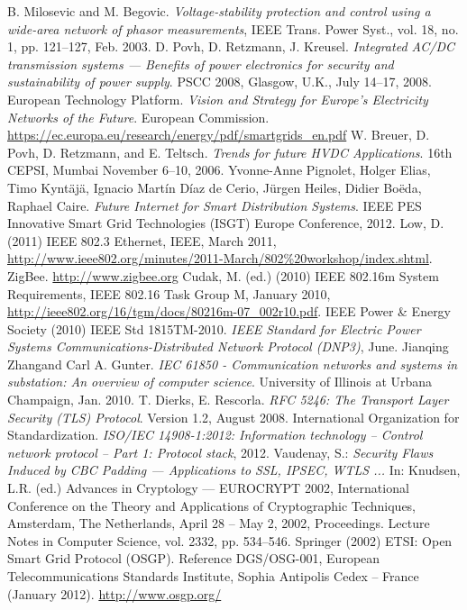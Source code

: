 \documentclass[11pt,oneside]{book}
\begin{document}
\begin{thebibliography}{99}
 B. Milosevic and M. Begovic. \emph{Voltage-stability protection and control using a wide-area network of phasor measurements}, IEEE Trans. Power Syst., vol. 18, no. 1, pp. 121–127, Feb. 2003. 
 D. Povh, D. Retzmann, J. Kreusel. \emph{Integrated AC/DC transmission systems — Benefits of power electronics for security and sustainability of power supply}. PSCC 2008, Glasgow, U.K., July 14–17, 2008. 
 European Technology Platform. \emph{Vision and Strategy for Europe’s Electricity Networks of the Future}. European Commission. \url{https://ec.europa.eu/research/energy/pdf/smartgrids_en.pdf}
 W. Breuer, D. Povh, D. Retzmann, and E. Teltsch. \emph{Trends for future HVDC Applications}. 16th CEPSI, Mumbai November 6–10, 2006.
 Yvonne-Anne Pignolet, Holger Elias, Timo Kyntäjä, Ignacio Martín Díaz de Cerio, Jürgen Heiles, Didier Boëda, Raphael Caire. \emph{Future Internet for Smart Distribution Systems}. IEEE PES Innovative Smart Grid Technologies (ISGT) Europe Conference, 2012.
 Low, D. (2011) IEEE 802.3 Ethernet, IEEE, March 2011, \url{http://www.ieee802.org/minutes/2011-March/802\%20workshop/index.shtml}.
 ZigBee. \url{http://www.zigbee.org}
 Cudak, M. (ed.) (2010) IEEE 802.16m System Requirements, IEEE 802.16 Task Group M, January 2010, \url{http://ieee802.org/16/tgm/docs/80216m-07_002r10.pdf}.
 IEEE Power \& Energy Society (2010) IEEE Std 1815TM-2010. \emph{IEEE Standard for Electric Power Systems Communications-Distributed Network Protocol (DNP3)}, June.
 Jianqing Zhangand Carl A. Gunter. \emph{IEC 61850 - Communication networks and systems in substation: An overview of computer science}.
University of Illinois at Urbana Champaign, Jan. 2010.
 T. Dierks, E. Rescorla. \emph{RFC 5246: The Transport Layer Security (TLS) Protocol}. Version 1.2, August 2008.
 International Organization for Standardization. \emph{ISO/IEC 14908-1:2012: Information technology – Control network protocol – Part 1: Protocol stack}, 2012.
 Vaudenay, S.: \emph{Security Flaws Induced by CBC Padding — Applications to SSL, IPSEC, WTLS ... }In: Knudsen, L.R. (ed.) Advances in Cryptology — EUROCRYPT 2002, International Conference on the Theory and Applications of Cryptographic Techniques, Amsterdam, The Netherlands, April 28 – May 2, 2002, Proceedings. Lecture Notes in Computer Science, vol. 2332, pp. 534–546. Springer (2002)
 ETSI: Open Smart Grid Protocol (OSGP). Reference DGS/OSG-001, European Telecommunications Standards Institute, Sophia Antipolis Cedex – France (January 2012). \url{http://www.osgp.org/}

\end{thebibliography}
\end{document}
